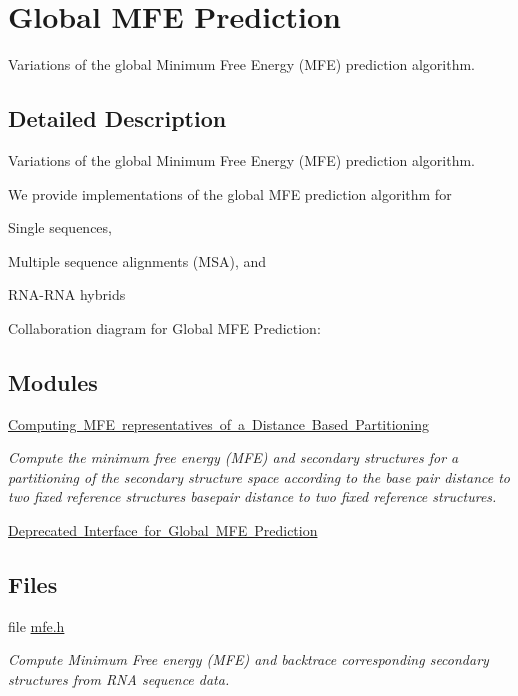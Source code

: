 \hypertarget{group__mfe__global}{}\section{Global M\+FE Prediction}
\label{group__mfe__global}


Variations of the global Minimum Free Energy (M\+FE) prediction algorithm.  




\subsection{Detailed Description}
Variations of the global Minimum Free Energy (M\+FE) prediction algorithm. 

We provide implementations of the global M\+FE prediction algorithm for
\begin{DoxyItemize}
\item Single sequences,
\item Multiple sequence alignments (M\+SA), and
\item R\+N\+A-\/\+R\+NA hybrids 
\end{DoxyItemize}Collaboration diagram for Global M\+FE Prediction\+:
\subsection*{Modules}
\begin{DoxyCompactItemize}
\item 
\mbox{\hyperlink{group__kl__neighborhood__mfe}{Computing M\+F\+E representatives of a Distance Based Partitioning}}
\begin{DoxyCompactList}\small\item\em Compute the minimum free energy (M\+FE) and secondary structures for a partitioning of the secondary structure space according to the base pair distance to two fixed reference structures basepair distance to two fixed reference structures. \end{DoxyCompactList}\item 
\mbox{\hyperlink{group__mfe__global__deprecated}{Deprecated Interface for Global M\+F\+E Prediction}}
\end{DoxyCompactItemize}
\subsection*{Files}
\begin{DoxyCompactItemize}
\item 
file \mbox{\hyperlink{mfe_8h}{mfe.\+h}}
\begin{DoxyCompactList}\small\item\em Compute Minimum Free energy (M\+FE) and backtrace corresponding secondary structures from R\+NA sequence data. \end{DoxyCompactList}\end{DoxyCompactItemize}
